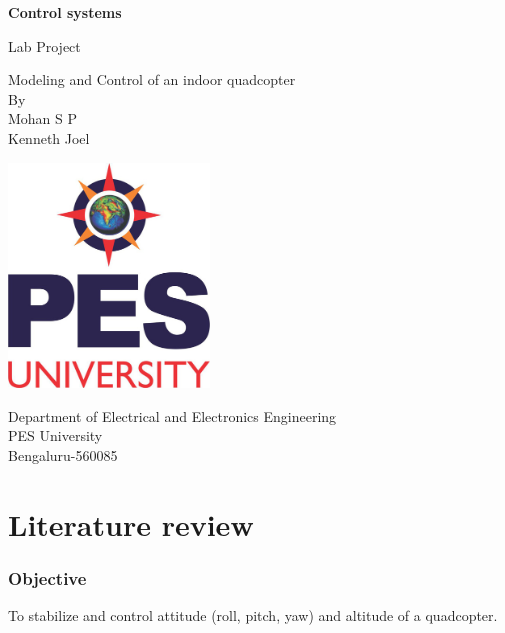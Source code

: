 \documentclass[9pt]{article}
\begin{document}
\begin{titlepage}
    \begin{center}
        \vspace*{1cm}
        
        \Huge
        \textbf{Control systems}
        
        \vspace{0.5cm}
        \LARGE
        Lab Project
        \vspace{0.5cm}
        
Modeling and Control of an indoor quadcopter\\
By\\
Mohan S P\\
Kenneth Joel 
        \vspace{0.8cm}
        
        \includegraphics[width=0.4\textwidth]{university.jpg}
        
        \Large
        Department of Electrical and Electronics Engineering\\
        PES University\\
        Bengaluru-560085\\
    \end{center}
\end{titlepage}
 
\tableofcontents

\newpage

\part{Literature review}

\section{Objective}

To stabilize and control attitude (roll, pitch, yaw) and altitude of a quadcopter.
\end{document}
